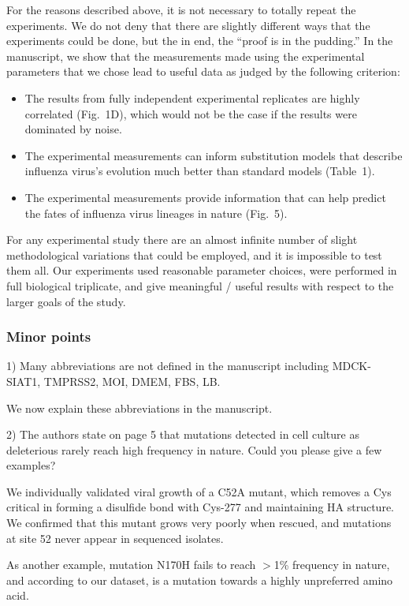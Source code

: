 \documentclass[11pt, oneside]{article}   	%
\newcommand{\response}[1]{{\color{black}#1}}
\begin{document}
\response{For the reasons described above, it is not necessary to totally repeat the experiments.
We do not deny that there are slightly different ways that the experiments could be done, but the in end, the ``proof is in the pudding.'' 
In the manuscript, we show that the measurements made using the experimental parameters that we chose lead to useful data as judged by the following criterion:
\begin{itemize}
\item The results from fully independent experimental replicates are highly correlated (Fig.~1D), which would not be the case if the results were dominated by noise.
\item The experimental measurements can inform substitution models that describe influenza virus's evolution much better than standard models (Table~1).
\item The experimental measurements provide information that can help predict the fates of influenza virus lineages in nature (Fig.~5).
\end{itemize}
For any experimental study there are an almost infinite number of slight methodological variations that could be employed, and it is impossible to test them all.
Our experiments used reasonable parameter choices, were performed in full biological triplicate, and give meaningful / useful results with respect to the larger goals of the study.}

\subsubsection*{Minor points} 

1) Many abbreviations are not defined in the manuscript including MDCK-SIAT1, TMPRSS2, MOI, DMEM, FBS, LB. 

\response{We now explain these abbreviations in the manuscript.}

2) The authors state on page 5 that mutations detected in cell culture as deleterious rarely reach high frequency in nature. Could you please give a few examples? 

\response{We individually validated viral growth of a C52A mutant, which removes a Cys critical in forming a disulfide bond with Cys-277 and maintaining HA structure.
We confirmed that this mutant grows very poorly when rescued, and mutations at site 52 never appear in sequenced isolates.

As another example, mutation N170H fails to reach $>$1\% frequency in nature, and according to our dataset, is a mutation towards a highly unpreferred amino acid. 
}
\end{document}
